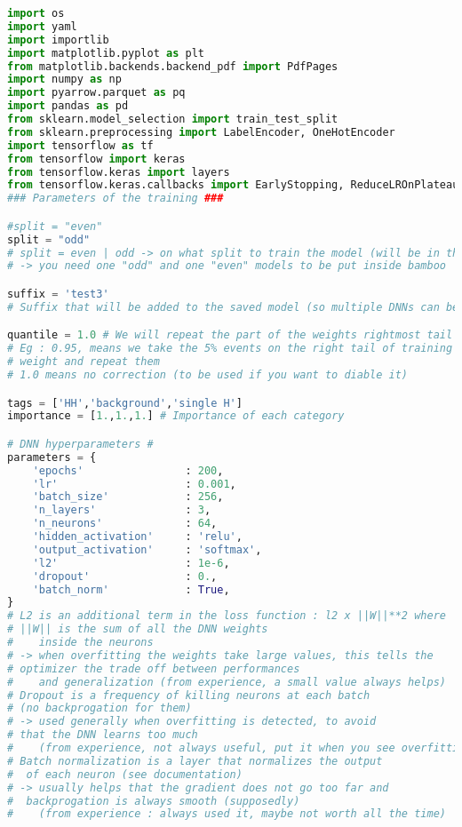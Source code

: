 \begin{lstlisting}[language=Python, caption=DNN setup for the \wwgg semi-leptonic final state, label={dnncode}]
import os
import yaml
import importlib
import matplotlib.pyplot as plt
from matplotlib.backends.backend_pdf import PdfPages
import numpy as np
import pyarrow.parquet as pq
import pandas as pd
from sklearn.model_selection import train_test_split
from sklearn.preprocessing import LabelEncoder, OneHotEncoder 
import tensorflow as tf
from tensorflow import keras
from tensorflow.keras import layers
from tensorflow.keras.callbacks import EarlyStopping, ReduceLROnPlateau
### Parameters of the training ###

#split = "even" 
split = "odd" 
# split = even | odd -> on what split to train the model (will be in the name)
# -> you need one "odd" and one "even" models to be put inside bamboo

suffix = 'test3'
# Suffix that will be added to the saved model (so multiple DNNs can be trained)

quantile = 1.0 # We will repeat the part of the weights rightmost tail
# Eg : 0.95, means we take the 5% events on the right tail of training 
# weight and repeat them
# 1.0 means no correction (to be used if you want to diable it)

tags = ['HH','background','single H']
importance = [1.,1.,1.] # Importance of each category

# DNN hyperparameters #
parameters = {
    'epochs'                : 200,
    'lr'                    : 0.001,
    'batch_size'            : 256,
    'n_layers'              : 3,
    'n_neurons'             : 64,
    'hidden_activation'     : 'relu',
    'output_activation'     : 'softmax',
    'l2'                    : 1e-6,
    'dropout'               : 0.,
    'batch_norm'            : True,
}
# L2 is an additional term in the loss function : l2 x ||W||**2 where 
# ||W|| is the sum of all the DNN weights 
#    inside the neurons
# -> when overfitting the weights take large values, this tells the 
# optimizer the trade off between performances
#    and generalization (from experience, a small value always helps)
# Dropout is a frequency of killing neurons at each batch
# (no backprogation for them)
# -> used generally when overfitting is detected, to avoid
# that the DNN learns too much 
#    (from experience, not always useful, put it when you see overfitting)
# Batch normalization is a layer that normalizes the output
#  of each neuron (see documentation)
# -> usually helps that the gradient does not go too far and
#  backprogation is always smooth (supposedly)
#    (from experience : always used it, maybe not worth all the time)



\end{lstlisting}
